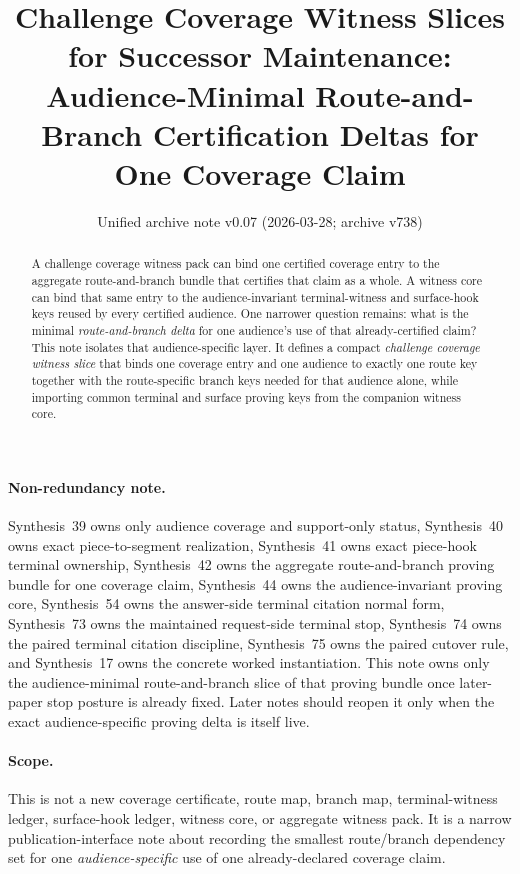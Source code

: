 \documentclass[11pt]{article}
\title{Challenge Coverage Witness Slices for Successor Maintenance:\\[0.5ex]
\large Audience-Minimal Route-and-Branch Certification Deltas for One Coverage Claim}
\author{}
\date{Unified archive note v0.07 (2026-03-28; archive v738)}
\begin{document}
\maketitle

\begin{abstract}
A challenge coverage witness pack can bind one certified coverage entry to the aggregate route-and-branch bundle that certifies that claim as a whole.
A witness core can bind that same entry to the audience-invariant terminal-witness and surface-hook keys reused by every certified audience.
One narrower question remains: what is the minimal \emph{route-and-branch delta} for one audience's use of that already-certified claim?
This note isolates that audience-specific layer.
It defines a compact \emph{challenge coverage witness slice} that binds one coverage entry and one audience to exactly one route key together with the route-specific branch keys needed for that audience alone, while importing common terminal and surface proving keys from the companion witness core.
\end{abstract}

\paragraph{Non-redundancy note.}
Synthesis~39 owns only audience coverage and support-only status, Synthesis~40 owns exact piece-to-segment realization, Synthesis~41 owns exact piece-hook terminal ownership, Synthesis~42 owns the aggregate route-and-branch proving bundle for one coverage claim, Synthesis~44 owns the audience-invariant proving core, Synthesis~54 owns the answer-side terminal citation normal form, Synthesis~73 owns the maintained request-side terminal stop, Synthesis~74 owns the paired terminal citation discipline, Synthesis~75 owns the paired cutover rule, and Synthesis~17 owns the concrete worked instantiation.
This note owns only the audience-minimal route-and-branch slice of that proving bundle once later-paper stop posture is already fixed. Later notes should reopen it only when the exact audience-specific proving delta is itself live.
\paragraph{Scope.}
This is not a new coverage certificate, route map, branch map, terminal-witness ledger, surface-hook ledger, witness core, or aggregate witness pack.
It is a narrow publication-interface note about recording the smallest route/branch dependency set for one \emph{audience-specific} use of one already-declared coverage claim.
\end{document}
